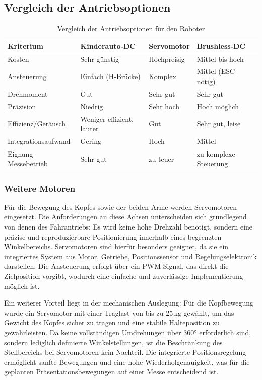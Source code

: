 \subsection*{Vergleich der Antriebsoptionen}

\begin{table}[h!]
	\centering
	\renewcommand{\arraystretch}{1.2}
	\begin{tabular}{|p{3.5cm}|p{3.5cm}|p{3.5cm}|p{3.5cm}|}
		\hline
		\textbf{Kriterium} & \textbf{Kinderauto-DC} & \textbf{Servomotor} & \textbf{Brushless-DC} \\
		\hline
		Kosten & Sehr günstig & Hochpreisig & Mittel bis hoch \\
		\hline
		Ansteuerung & Einfach (H-Brücke) & Komplex & Mittel (ESC nötig) \\
		\hline
		Drehmoment & Gut & Sehr gut & Sehr gut \\
		\hline
		Präzision & Niedrig & Sehr hoch & Hoch möglich \\
		\hline
		Effizienz/Geräusch & Weniger effizient, lauter & Gut & Sehr gut, leise \\
		\hline
		Integrationsaufwand & Gering & Hoch & Mittel \\
		\hline
		Eignung Messebetrieb & Sehr gut & zu teuer & zu komplexe Steuerung \\
		\hline
	\end{tabular}
	\caption{Vergleich der Antriebsoptionen für den Roboter}
\end{table}
\subsubsection{Weitere Motoren}
Für die Bewegung des Kopfes sowie der beiden Arme werden Servomotoren eingesetzt. Die Anforderungen an diese Achsen unterscheiden sich grundlegend von denen des Fahrantriebs: Es wird keine hohe Drehzahl benötigt, sondern eine präzise und reproduzierbare Positionierung innerhalb eines begrenzten Winkelbereichs. Servomotoren sind hierfür besonders geeignet, da sie ein integriertes System aus Motor, Getriebe, Positionssensor und Regelungselektronik darstellen. Die Ansteuerung erfolgt über ein PWM-Signal, das direkt die Zielposition vorgibt, wodurch eine einfache und zuverlässige Implementierung möglich ist.

Ein weiterer Vorteil liegt in der mechanischen Auslegung: Für die Kopfbewegung wurde ein Servomotor mit einer Traglast von bis zu 25\,kg gewählt, um das Gewicht des Kopfes sicher zu tragen und eine stabile Halteposition zu gewährleisten. Da keine vollständigen Umdrehungen über 360° erforderlich sind, sondern lediglich definierte Winkelstellungen, ist die Beschränkung des Stellbereichs bei Servomotoren kein Nachteil. Die integrierte Positionsregelung ermöglicht sanfte Bewegungen und eine hohe Wiederholgenauigkeit, was für die geplanten Präsentationsbewegungen auf einer Messe entscheidend ist.


